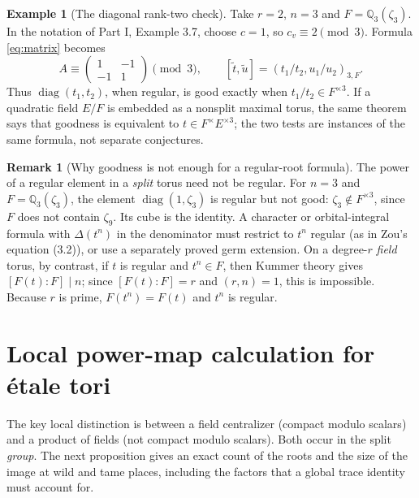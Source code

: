 \documentclass[11pt]{article}
\theoremstyle{plain}
\theoremstyle{definition}
\newtheorem{remark}[theorem]{Remark}
\newtheorem{example}[theorem]{Example}
\begin{document}
\begin{example}[The diagonal rank-two check]\label{ex:diag}
Take $r=2$, $n=3$ and $F=\mathbb Q_3(\zeta_3)$.
In the notation of Part I, Example 3.7, choose $c=1$, so
$c_v\equiv2\pmod3$.  Formula \eqref{eq:matrix} becomes
\[
 A\equiv\begin{pmatrix}1&-1\\-1&1\end{pmatrix}\pmod3,
 \qquad
 [\widetilde t,\widetilde u]
 =(t_1/t_2,u_1/u_2)_{3,F}.
\]
Thus $\operatorname{diag}(t_1,t_2)$, when regular, is good exactly
when $t_1/t_2\in F^{\times3}$.  If a quadratic field $E/F$ is
embedded as a nonsplit maximal torus, the same theorem says that
goodness is equivalent to $t\in F^\times E^{\times3}$; the two
tests are instances of the same formula, not separate conjectures.
\end{example}

\begin{remark}[Why goodness is not enough for a regular-root formula]\label{rem:power-singular}
The power of a regular element in a \emph{split} torus need not be
regular.  For $n=3$ and $F=\mathbb Q_3(\zeta_3)$, the element
$\operatorname{diag}(1,\zeta_3)$ is regular but not good:
$\zeta_3\notin F^{\times3}$, since $F$ does not contain $\zeta_9$.
Its cube is the identity.  A character or orbital-integral formula with
$\Delta(t^n)$ in the denominator must restrict to $t^n$ regular
(as in Zou's equation (3.2)), or use a separately proved germ extension.
On a degree-$r$ \emph{field} torus, by contrast, if $t$ is regular
and $t^n\in F$, then Kummer theory gives
$[F(t):F]\mid n$; since $[F(t):F]=r$ and $(r,n)=1$, this is
impossible.  Because $r$ is prime, $F(t^n)=F(t)$ and $t^n$ is regular.
\end{remark}

\section{Local power-map calculation for \texorpdfstring{\'etale}{etale} tori}\label{sec:localpowers}
The key local distinction is between a field centralizer (compact
modulo scalars) and a product of fields (not compact modulo scalars).
Both occur in the split \emph{group}.  The next proposition gives
an exact count of the roots and the size of the image at wild and
tame places, including the factors that a global trace identity
must account for.
\end{document}
